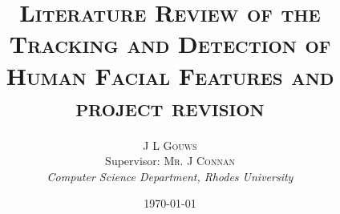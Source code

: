 \documentclass[11pt,a4paper,titlepage]{article}
\title{
\textsc{Literature Review of the Tracking and Detection of Human Facial Features and project revision}
}
\author{\textsc{J L Gouws}
\\Supervisor: \textsc{Mr. J Connan}
\\ \emph{Computer Science Department, Rhodes University}}
\date{\today
\\[1cm]}
\begin{document}
\begin{titlepage}
  \maketitle
  
\end{titlepage}


%
%
%
%





%
%



 

\end{document}
